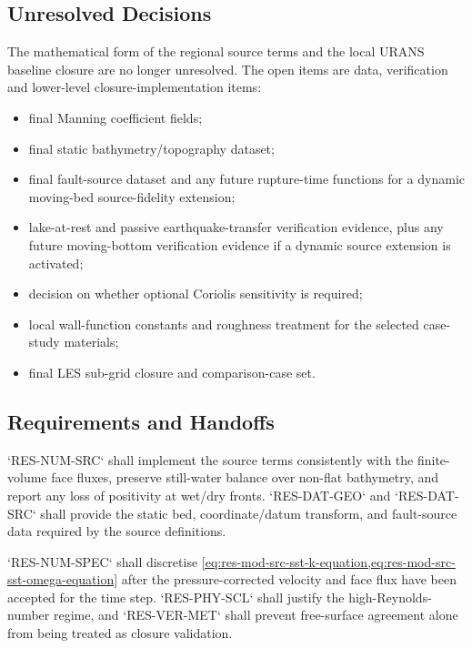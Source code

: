 \subsection{Unresolved Decisions}
\label{sec:res-mod-src-unresolved-decisions}


The mathematical form of the regional source terms and the local URANS
baseline closure are no longer unresolved. The open items are data,
verification and lower-level closure-implementation items:

\begin{itemize}
  \item final Manning coefficient fields;
  \item final static bathymetry/topography dataset;
  \item final fault-source dataset and any future rupture-time
    functions for a dynamic moving-bed source-fidelity extension;
  \item lake-at-rest and passive earthquake-transfer verification
    evidence, plus any future moving-bottom verification evidence if a
    dynamic source extension is activated;
  \item decision on whether optional Coriolis sensitivity is required;
  \item local wall-function constants and roughness treatment for the
    selected case-study materials;
  \item final LES sub-grid closure and comparison-case set.
\end{itemize}

\subsection{Requirements and Handoffs}
\label{sec:res-mod-src-requirements}


`RES-NUM-SRC` shall implement the source terms consistently with the
finite-volume face fluxes, preserve still-water balance over non-flat
bathymetry, and report any loss of positivity at wet/dry fronts.
`RES-DAT-GEO` and `RES-DAT-SRC` shall provide the static bed,
coordinate/datum transform, and fault-source data required by the
source definitions.

`RES-NUM-SPEC` shall discretise
\cref{eq:res-mod-src-sst-k-equation,eq:res-mod-src-sst-omega-equation}
after the pressure-corrected velocity and face flux have been accepted
for the time step. `RES-PHY-SCL` shall justify the high-Reynolds-number
regime, and `RES-VER-MET` shall prevent free-surface agreement alone
from being treated as closure validation.

